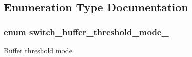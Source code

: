 \subsection{Enumeration Type Documentation}
\hypertarget{group__Buffer_gac87a7ce93aa67b659785638242b57c9a}{
\subsubsection[{switch\+\_\+buffer\+\_\+threshold\+\_\+mode\+\_\+}]{\setlength{\rightskip}{0pt plus 5cm}enum {\bf switch\+\_\+buffer\+\_\+threshold\+\_\+mode\+\_\+}}}\label{group__Buffer_gac87a7ce93aa67b659785638242b57c9a}
Buffer threshold mode 

